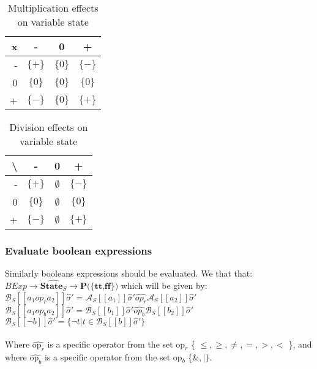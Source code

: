 \begin{table}[h]
\begin{tabular}{| r | c | c | c |}
\hline
 x   & -           & 0 & + \\
\hline
 -  & $\{+\}$ & $\{0\}$ & $\{-\}$ \\
\hline
 0  & $\{0\}$ & $\{0\}$ & $\{0\}$ \\
\hline
 +  & $\{-\}$ & $\{0\}$ & $\{+\}$ \\
\hline
\end{tabular}
\centering
\caption{Multiplication effects on variable state}
\label{table:arithmetic_multiply}
\end{table}

\begin{table}[h]
\begin{tabular}{| r | c | c | c |}
\hline
 \textbackslash   & -           & 0 & + \\
\hline
 -  & $\{+\}$ & $\emptyset$ & $\{-\}$ \\
\hline
 0  & $\{0\}$ & $\emptyset$ & $\{0\}$ \\
\hline
 +  & $\{-\}$ & $\emptyset$ & $\{+\}$ \\
\hline
\end{tabular}
\centering
\caption{Division effects on variable state}
\label{table:arithmetic_division}
\end{table}

\subsubsection{Evaluate boolean expressions}
Similarly booleans expressions should be evaluated. We that that:\\
$BExp \rightarrow \widehat{\textbf{State}_S} \rightarrow \textbf{P(\{tt,ff\})}$ which will be given by:\\
$\mathcal{B}_S [\![a_1op_ra_2]\!]\widehat{\sigma}' = \mathcal{A}_S [\![a_1]\!]\widehat{\sigma}'\widehat{op_r}\mathcal{A}_S [\![a_2]\!]\widehat{\sigma}'$\\
$\mathcal{B}_S [\![a_1op_ba_2]\!]\widehat{\sigma}' = \mathcal{B}_S [\![b_1]\!]\widehat{\sigma}'\widehat{op_b}\mathcal{B}_S [\![b_2]\!]\widehat{\sigma}'$\\
$\mathcal{B}_S [\![\neg b]\!]\widehat{\sigma}' =\{\neg t|t\in \mathcal{B}_S[\![b]\!]\widehat{\sigma}'\}$\\
\\
Where $\widehat{\text{op}_r}$ is a specific  operator from the set op$_r$ \{ $\leq,\geq,\neq,=,>,<$ \}, and where $\widehat{\text{op}_b}$ is a specific operator from the set op$_b$ \{$\&,|\}$.

